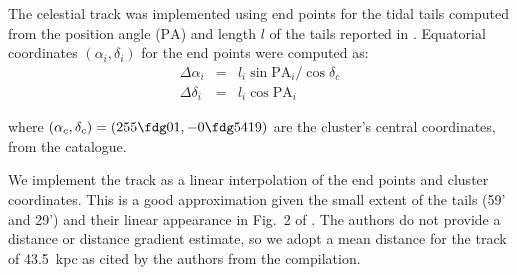The celestial track was implemented using end points for the tidal tails computed from the position angle ($\mathrm{PA}$) and length $l$ of the tails reported in \citet{Myeong2017}. Equatorial coordinates $(\alpha_i,\delta_i)$ for the end points were computed as:
\begin{eqnarray*}
\Delta\alpha_i &=& l_i\sin{\mathrm{PA}_i}/\cos{\delta_c} \\
\Delta\delta_i &=& l_i\cos{\mathrm{PA}_i} 
\end{eqnarray*}

where $(\alpha_c,\delta_c)=(255\fdg 01,-0\fdg 5419)$ are the cluster's central coordinates, from the \citet{Harris1996} catalogue.

We implement the track as a linear interpolation of the end points and cluster coordinates. This is a good approximation given the small extent of the tails (59' and 29') and their linear appearance in Fig.~2 of \citet{Myeong2017}.
The authors do not provide a distance or distance gradient estimate, so we adopt a mean distance for the track of 43.5~kpc as cited by the authors from the \citet{Harris1996} compilation.
